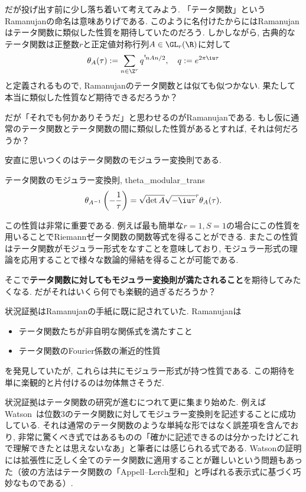 \documentclass[11pt,b5paper,oneside,lualatex]{ltjsarticle} %
\numberwithin{equation}{section} %
\begin{document}
だが投げ出す前に少し落ち着いて考えてみよう. 
「テータ関数」というRamanujanの命名は意味ありげである. 
このように名付けたからにはRamanujanはテータ関数に類似した性質を期待していたのだろう. 
しかしながら, 古典的なテータ関数は正整数$ r $と正定値対称行列$ A \in \GL_r(\R) $に対して
\[
\theta_A (\tau) :=
\sum_{n \in \Z^r} q^{{}^t\!n A n/2}, \quad
q := e^{2\pi\iu\tau}
\]
と定義されるもので, Ramanujanのテータ関数とは似ても似つかない. 
果たして本当に類似した性質など期待できるだろうか？

だが「それでも何かありそうだ」と思わせるのがRamanujanである. 
もし仮に通常のテータ関数とテータ関数の間に類似した性質があるとすれば, それは何だろうか？

安直に思いつくのはテータ関数のモジュラー変換則である. 

\begin{prop}{テータ関数のモジュラー変換則, {\cite[命題2.5.1]{高瀬}}}{theta_modular_trans}
	\[
	\theta_{A^{-1}} \left( -\frac{1}{\tau} \right) =
	\sqrt{\det A} \sqrt{-\iu \tau}^r \theta_A (\tau).
	\]
\end{prop}

この性質は非常に重要である. 
例えば最も簡単な$ r = 1, S = 1 $の場合にこの性質を用いることでRiemannゼータ関数の関数等式を得ることができる. 
またこの性質はテータ関数がモジュラー形式をなすことを意味しており, モジュラー形式の理論を応用することで様々な数論的帰結を得ることが可能である. 

そこで\textbf{テータ関数に対してもモジュラー変換則が満たされること}を期待してみたくなる. 
だがそれはいくら何でも楽観的過ぎるだろうか？

状況証拠はRamanujanの手紙に既に記されていた. 
Ramanujanは
\begin{itemize}
	\item {}テータ関数たちが非自明な関係式を満たすこと
	\item {}テータ関数のFourier係数の漸近的性質
\end{itemize}
を発見していたが, これらは共にモジュラー形式が持つ性質である. 
この期待を単に楽観的と片付けるのは勿体無さそうだ. 

状況証拠はテータ関数の研究が進むにつれて更に集まり始めた. 
例えばWatson~\cite[pp. 78]{Watson}は位数$ 3 $のテータ関数に対してモジュラー変換則を記述することに成功している. 
それは通常のテータ関数のような単純な形ではなく誤差項を含んでおり, 非常に驚くべき式ではあるものの「確かに記述できるのは分かったけどこれで理解できたとは思えないなあ」と筆者には感じられる式である. 
Watsonの証明には拡張性に乏しく全てのテータ関数に適用することが難しいという問題もあった（彼の方法はテータ関数の「Appell--Lerch型和」と呼ばれる表示式に基づく巧妙なものである）. 
\end{document}
